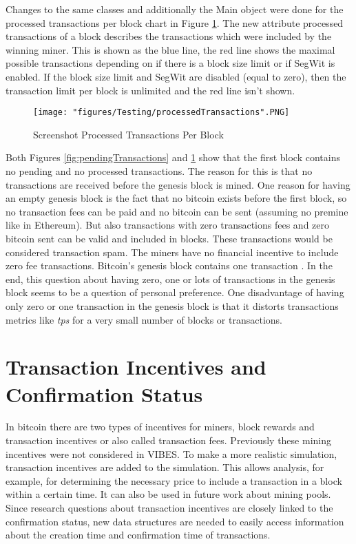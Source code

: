 Changes to the same classes and additionally the Main object were done for the processed transactions per block chart in Figure \ref{fig:processedTransactions}. The new attribute processed transactions of a block describes the transactions which were included by the winning miner. This is shown as the blue line, the red line shows the maximal possible transactions depending on if there is a block size limit or if SegWit is enabled. If the block size limit and SegWit are disabled (equal to zero), then the transaction limit per block is unlimited and the red line isn't shown.

\begin{figure}[!htb]
\centering
\texttt{[image: "figures/Testing/processedTransactions".PNG]}
\caption{Screenshot Processed Transactions Per Block
\label{fig:processedTransactions}}
\end{figure}

Both Figures \ref{fig:pendingTransactions} and \ref{fig:processedTransactions} show that the first block contains no pending and no processed transactions. The reason for this is that no transactions are received before the genesis block is mined. One reason for having an empty genesis block is the fact that no bitcoin exists before the first block, so no transaction fees can be paid and no bitcoin can be sent (assuming no premine like in Ethereum). But also transactions with zero transactions fees and zero bitcoin sent can be valid and included in blocks. These transactions would be considered transaction spam. The miners have no financial incentive to include zero fee transactions. Bitcoin's genesis block contains one transaction \cite{genesis}. In the end, this question about having zero, one or lots of transactions in the genesis block seems to be a question of personal preference. One disadvantage of having only zero or one transaction in the genesis block is that it distorts transactions metrics like \textit{tps} for a very small number of blocks or transactions.

\section{Transaction Incentives and Confirmation Status}

In bitcoin there are two types of incentives for miners, block rewards and transaction incentives or also called transaction fees. Previously these mining incentives were not considered in VIBES. To make a more realistic simulation, transaction incentives are added to the simulation. This allows analysis, for example, for determining the necessary price to include a transaction in a block within a certain time. It can also be used in future work about mining pools. Since research questions about transaction incentives are closely linked to the confirmation status, new data structures are needed to easily access information about the creation time and confirmation time of transactions.

